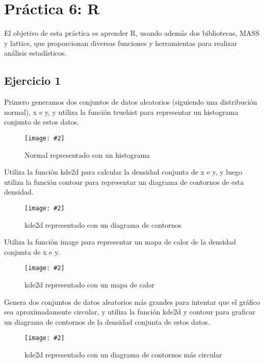 \documentclass[
12pt, 
spanish, 
singlespacing,
headsepline
]{article}
\newcommand{\smallimage}[2]{
\begin{figure}[H]
	\caption{#1}
	\centering
	\texttt{[image: \#2]}
\end{figure}
}
\begin{document}
\section{Práctica 6: R}
El objetivo de esta práctica es aprender R, usando además dos bibliotecas, MASS y lattice, que proporcionan diversas funciones y herramientas para realizar análisis estadísticos.

\subsection{Ejercicio 1}
Primero generamos dos conjuntos de datos aleatorios (siguiendo una distribución normal), x e y, y utiliza la función truehist para representar un histograma conjunto de estos datos.

\smallimage{Normal representado con un histograma}{R/rnorm.png}


Utiliza la función kde2d para calcular la densidad conjunta de x e y, y luego utiliza la función contour para representar un diagrama de contornos de esta densidad.

\smallimage{kde2d representado con un diagrama de contornos}{R/contourkde2d.png}

Utiliza la función image para representar un mapa de calor de la densidad conjunta de x e y.

\smallimage{kde2d representado con un mapa de calor}{R/imagedd.png}

Genera dos conjuntos de datos aleatorios más grandes para intentar que el gráfico sea aproximadamente circular, y utiliza la función kde2d y contour para graficar un diagrama de contornos de la densidad conjunta de estos datos.

\smallimage{kde2d representado con un diagrama de contornos más circular}{R/contourkde2d-big.png}
\end{document}
